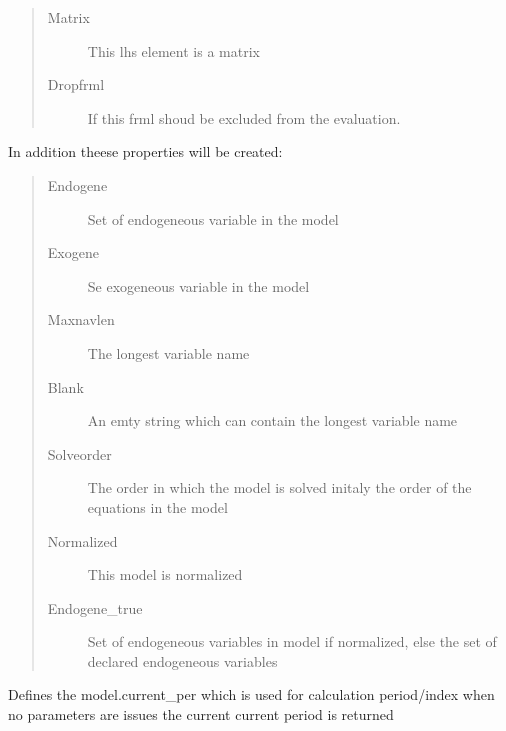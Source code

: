\documentclass[letterpaper,10pt,english]{sphinxmanual}
\begin{document}
\begin{fulllineitems}
\begin{fulllineitems}
\begin{quote}
\begin{description}
\item[{Matrix}] \leavevmode
\sphinxAtStartPar
This lhs element is a matrix

\item[{Dropfrml}] \leavevmode
\sphinxAtStartPar
If this frml shoud be excluded from the evaluation.

\end{description}\end{quote}

\sphinxAtStartPar
In addition theese properties will be created:
\begin{quote}\begin{description}
\item[{Endogene}] \leavevmode
\sphinxAtStartPar
Set of endogeneous variable in the model

\item[{Exogene}] \leavevmode
\sphinxAtStartPar
Se exogeneous variable in the model

\item[{Maxnavlen}] \leavevmode
\sphinxAtStartPar
The longest variable name

\item[{Blank}] \leavevmode
\sphinxAtStartPar
An emty string which can contain the longest variable name

\item[{Solveorder}] \leavevmode
\sphinxAtStartPar
The order in which the model is solved \sphinxhyphen{} initaly the order of the equations in the model

\item[{Normalized}] \leavevmode
\sphinxAtStartPar
This model is normalized

\item[{Endogene\_true}] \leavevmode
\sphinxAtStartPar
Set of endogeneous variables in model if normalized, else the set of declared endogeneous variables

\end{description}\end{quote}

\end{fulllineitems}


\begin{fulllineitems}
\label{\detokenize{index:modelclass.BaseModel.smpl}}
\pysigstartsignatures
{}
\pysigstopsignatures
\sphinxAtStartPar
Defines the model.current\_per which is used for calculation period/index
when no parameters are issues the current current period is returned


\end{fulllineitems}
\end{fulllineitems}
\end{document}
